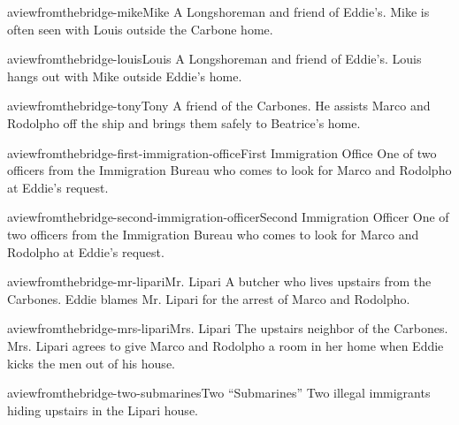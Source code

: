\documentclass[preview]{standalone}
\begin{document}
\begin{snippetcharacter}{aviewfromthebridge-mike}{Mike}
    A Longshoreman and friend of Eddie's. Mike is often seen with Louis outside the Carbone home.
\end{snippetcharacter}

\begin{snippetcharacter}{aviewfromthebridge-louis}{Louis}
    A Longshoreman and friend of Eddie's. Louis hangs out with Mike outside Eddie's home.
\end{snippetcharacter}

\begin{snippetcharacter}{aviewfromthebridge-tony}{Tony}
    A friend of the Carbones. He assists Marco and Rodolpho off the ship and brings them safely to Beatrice's home.
\end{snippetcharacter}

\begin{snippetcharacter}{aviewfromthebridge-first-immigration-office}{First Immigration Office}
    One of two officers from the Immigration Bureau who comes to look for Marco and Rodolpho at Eddie's request.
\end{snippetcharacter}

\begin{snippetcharacter}{aviewfromthebridge-second-immigration-officer}{Second Immigration Officer}
    One of two officers from the Immigration Bureau who comes to look for Marco and Rodolpho at Eddie's request.
\end{snippetcharacter}

\begin{snippetcharacter}{aviewfromthebridge-mr-lipari}{Mr. Lipari}
    A butcher who lives upstairs from the Carbones. Eddie blames Mr. Lipari for the arrest of Marco and Rodolpho.
\end{snippetcharacter}

\begin{snippetcharacter}{aviewfromthebridge-mrs-lipari}{Mrs. Lipari}
    The upstairs neighbor of the Carbones. Mrs. Lipari agrees to give Marco and Rodolpho a room in her home when Eddie kicks the men out of his house.
\end{snippetcharacter}

\begin{snippetcharacter}{aviewfromthebridge-two-submarines}{Two ``Submarines''}
    Two illegal immigrants hiding upstairs in the Lipari house.
\end{snippetcharacter}

\end{document}
